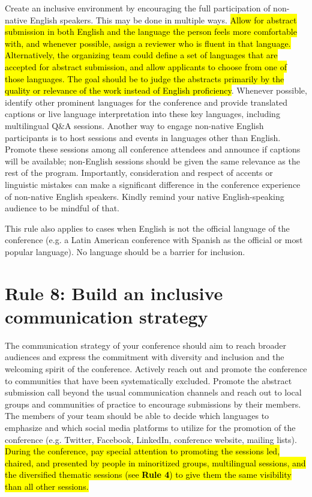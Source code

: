 \documentclass[10pt,letterpaper]{article}
\begin{document}
Create an inclusive environment by encouraging the full participation of non-native English speakers. This may be done in multiple ways.
\hl{Allow for abstract submission in both English and the language the person feels more comfortable with, and whenever possible, assign a reviewer who is fluent in that language. 
Alternatively, the organizing team could define a set of languages that are accepted for abstract submission, and allow applicants to choose from one of those languages. 
The goal should be to judge the abstracts primarily by the quality or relevance of the work instead of English proficiency}.
Whenever possible, identify other prominent languages for the conference and provide translated captions or live language interpretation into these key languages, including multilingual Q\&A sessions.
Another way to engage non-native English participants is to host sessions and events in languages other than English. 
Promote these sessions among all conference attendees and announce if captions will be available; non-English sessions should be given the same relevance as the rest of the program.
Importantly, consideration and respect of accents or linguistic mistakes can make a significant difference in the conference experience of non-native English speakers. Kindly remind your native English-speaking audience to be mindful of that.

This rule also applies to cases when English is not the official language of the conference (e.g. a Latin American conference with Spanish as the official or most popular language). No language should be a barrier for inclusion. 



\section*{Rule 8: Build an inclusive communication strategy}
\label{rule_communication}

The communication strategy of your conference should aim to reach broader audiences and express the commitment with diversity and inclusion and the welcoming spirit of the conference.
Actively reach out and promote the conference to communities that have been systematically excluded. 
Promote the abstract submission call beyond the usual communication channels and reach out to local groups and communities of practice to encourage submissions by their members.
The members of your team should be able to decide which languages to emphasize and which social media platforms to utilize for the promotion of the conference (e.g. Twitter, Facebook, LinkedIn, conference website, mailing lists).
\hl{During the conference, pay special attention to promoting the sessions led, chaired, and presented by people in minoritized groups, multilingual sessions, and the diversified thematic sessions (see \textbf{Rule 4}) to give them the same visibility than all other sessions.}
\end{document}

